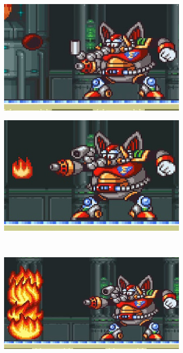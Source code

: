 \begin{figure}[h]
	\centering
	\begin{subfigure}{0.4\textwidth}
		\centering
		\includegraphics[width=\linewidth]{figures/X1/Mammoth_oil.jpg}
		\caption{}
	\end{subfigure}
	\begin{subfigure}{0.4\textwidth}
		\centering
		\includegraphics[width=\linewidth]{figures/X1/Mammoth_fire.jpg}
		\caption{}
	\end{subfigure}\\
	\begin{subfigure}{0.5\textwidth}
		\centering
		\includegraphics[width=\linewidth]{figures/X1/Mammoth_oil_fire.jpg}

\end{subfigure}
\end{figure}
